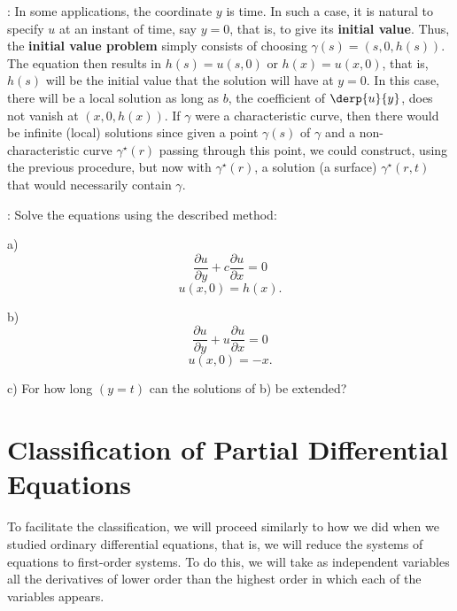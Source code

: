 \espa
\ejem: In some applications, the coordinate $y$ is time. In
such a case, it is natural to specify $u$ at an instant of time, say
$y=0$, that is, to give its {\bf initial value}. Thus, the {\bf initial value problem} simply consists of choosing $\gamma(s)=(s,0,h(s))$.
The
equation  then results in $h(s)=u(s,0)$ or $h(x)=u(x,0)$, 
that is, $h(s)$ will be the initial value
that the solution will have at $y=0$. In this case, there will be
a local solution as long as $b$, the coefficient of $\dip\derp{u}{y}$, 
does not vanish
at $(x,0,h(x))$. 
If $\gamma$ were a characteristic curve, then there would be infinite (local) solutions since given a point $\gamma(s)$ of $\gamma$ and a non-characteristic curve $\gamma^{\star}(r)$ passing through this point, we could construct, using the previous procedure, but now with $\gamma^{\star}(r)$, a solution (a surface) $\gamma^{\star}(r,t)$ that would necessarily contain $\gamma$.

\espa
\noi
\ejer: Solve the equations using the described method:
\espa

\noi
a) $$\frac{\partial u}{\partial y} + c\frac{\partial u}{\partial x} =0$$
   $$ u(x,0) = h(x).$$

\noi
b) $$\frac{\partial u}{\partial y} + u\frac{\partial u}{\partial x} =0$$
   $$ u(x,0) = -x.$$   

\noi
c) For how long $(y=t)$ can the solutions of b) be extended?



\section{Classification of Partial Differential Equations}

To facilitate the classification, we will proceed similarly to how we did when we studied ordinary differential equations, that is, we will reduce the systems of equations to first-order systems. To do this, we will take as independent variables all the derivatives of lower order than the highest order in which each of the variables appears.

